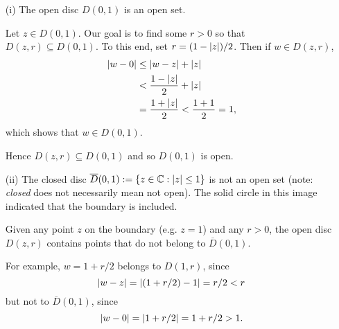 \begin{example}
\begin{itemize}
\item[(i)] The open disc $D(0,1)$ is an open set.


\begin{full}
Let $z \in D(0,1)$.  Our goal is to find some $r>0$ so that $D(z,r) \subseteq D(0,1)$. To this end, set $r= (1-\left| z \right|)/2$. Then if $w \in D(z,r)$,
\begin{align*}
\left| w-0 \right| & \leq \left| w-z \right| + \left| z \right| \\
& < \frac{1-\left| z \right|}{2} +\left| z \right| \\
&= \frac{1+\left| z \right|}{2} < \frac{1+1}{2} = 1,
\end{align*}
which shows that $w \in D(0,1)$.

Hence $D(z,r) \subseteq D(0,1)$ and so $D(0,1)$ is open.
\end{full}

\item[(ii)] The closed disc $\overline{D} (0,1) := \left\{ z \in \mathbb{C}: \left| z \right| \leq 1 \right\}$ is not an open set (note: \emph{closed} does not necessarily mean not open).
{
The solid circle in this image indicated that the boundary is included.
}


\begin{blankbox}
Given any point $z$ on the boundary (e.g. $z=1$) and any $r>0$, the open disc $D(z,r)$ contains points that do not belong to $\overline{D}(0,1)$. 
\end{blankbox}
\begin{full}
 For example, $w=1+r/2$ belongs to $D(1,r)$, since
\[
\left| w-z \right| = \left| (1+r/2)-1 \right| = r/2 < r
\]
but not to $\overline{D} (0,1)$, since
\[
\left| w-0 \right| = \left| 1+r/2 \right| = 1+r/2 >1.
\]
\end{full}

\end{itemize}
\end{example}




